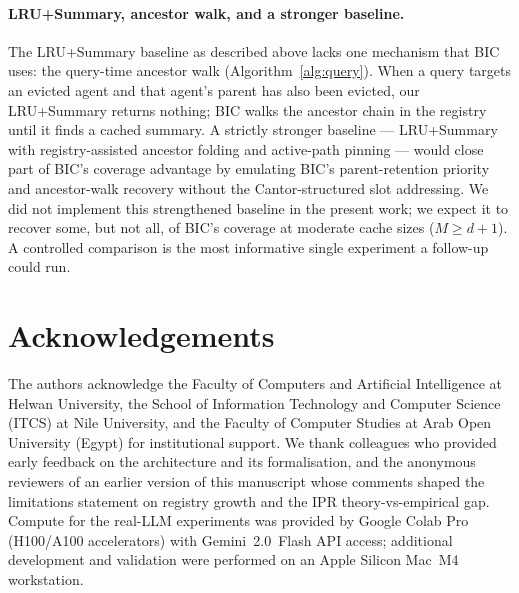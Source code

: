 \documentclass[fleqn,10pt]{article}
\theoremstyle{definition}
\newcommand{\slots}{M}
\begin{document}
\paragraph{LRU+Summary, ancestor walk, and a stronger baseline.}
The LRU+Summary baseline as described above lacks one mechanism that
BIC uses: the query-time ancestor walk (Algorithm~\ref{alg:query}).
When a query targets an evicted agent and that agent's parent has
also been evicted, our LRU+Summary returns nothing; BIC walks the
ancestor chain in the registry until it finds a cached summary. A
strictly stronger baseline --- LRU+Summary with registry-assisted
ancestor folding and active-path pinning ---
would close part of BIC's coverage advantage by emulating BIC's
parent-retention priority and ancestor-walk recovery without the
Cantor-structured slot addressing. We did not implement this
strengthened baseline in the present work; we expect it to recover
some, but not all, of BIC's coverage at moderate cache sizes
($\slots \geq d{+}1$). A controlled comparison is the most
informative single experiment a follow-up could run.





\section*{Acknowledgements}

The authors acknowledge the Faculty of Computers and Artificial
Intelligence at Helwan University, the School of Information
Technology and Computer Science (ITCS) at Nile University, and the
Faculty of Computer Studies at Arab Open University (Egypt) for
institutional support. We thank colleagues who provided early
feedback on the architecture and its formalisation, and the
anonymous reviewers of an earlier version of this manuscript whose
comments shaped the limitations statement on registry growth and the
IPR theory-vs-empirical gap. Compute for the real-LLM experiments
was provided by Google Colab Pro (H100/A100 accelerators) with
Gemini~2.0~Flash API access; additional development and validation
were performed on an Apple Silicon Mac~M4 workstation.
\end{document}
